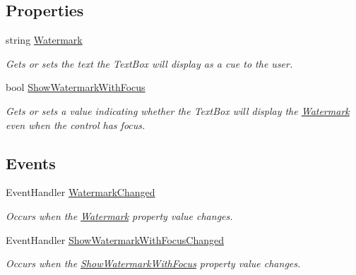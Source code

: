 \subsection*{Properties}
\begin{DoxyCompactItemize}
\item 
string \hyperlink{class_products_1_1_common_1_1_controls_1_1axl_textbox_a1f6cff9b93f4d5ced470db4a2042fa23}{Watermark}
\begin{DoxyCompactList}\small\item\em Gets or sets the text the Text\+Box will display as a cue to the user. \end{DoxyCompactList}\item 
bool \hyperlink{class_products_1_1_common_1_1_controls_1_1axl_textbox_aad1bf0a753543c298bafbb6356daafcb}{Show\+Watermark\+With\+Focus}
\begin{DoxyCompactList}\small\item\em Gets or sets a value indicating whether the Text\+Box will display the \hyperlink{class_products_1_1_common_1_1_controls_1_1axl_textbox_a1f6cff9b93f4d5ced470db4a2042fa23}{Watermark} even when the control has focus. \end{DoxyCompactList}\end{DoxyCompactItemize}
\subsection*{Events}
\begin{DoxyCompactItemize}
\item 
Event\+Handler \hyperlink{class_products_1_1_common_1_1_controls_1_1axl_textbox_a7a15986039ad0cad8914a27422a90ee6}{Watermark\+Changed}
\begin{DoxyCompactList}\small\item\em Occurs when the \hyperlink{class_products_1_1_common_1_1_controls_1_1axl_textbox_a1f6cff9b93f4d5ced470db4a2042fa23}{Watermark} property value changes. \end{DoxyCompactList}\item 
Event\+Handler \hyperlink{class_products_1_1_common_1_1_controls_1_1axl_textbox_ae0bbeda422657e4e5d6d59426e3ffb45}{Show\+Watermark\+With\+Focus\+Changed}
\begin{DoxyCompactList}\small\item\em Occurs when the \hyperlink{class_products_1_1_common_1_1_controls_1_1axl_textbox_aad1bf0a753543c298bafbb6356daafcb}{Show\+Watermark\+With\+Focus} property value changes. \end{DoxyCompactList}\end{DoxyCompactItemize}


